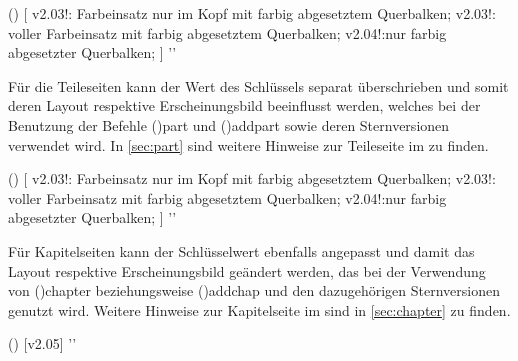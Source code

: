 \begin{DeclareEntity*}{}
\begin{DeclareEntity*}{}
\begin{DeclareEntity*}{}
\begin{Declaration}
  {}
  ()
[%
  v2.03!:%
    Farbeinsatz nur im Kopf mit farbig abgesetztem Querbalken;
  v2.03!:%
    voller Farbeinsatz mit farbig abgesetztem Querbalken;
  v2.04!:nur farbig abgesetzter Querbalken;%
]
  '\cdalias'
\printdeclarationlist[Teil|?]

Für die Teileseiten kann der Wert des Schlüssels  separat 
überschrieben und somit deren Layout respektive Erscheinungsbild beeinflusst 
werden, welches bei der Benutzung der Befehle 
\Macro(){part} und 
\Macro(){addpart} sowie deren Sternversionen 
verwendet wird. In \autoref{sec:part} sind weitere Hinweise zur Teileseite im 
\CD zu finden.
\end{Declaration}

\begin{Declaration}
  {}
  ()
[%
  v2.03!:%
    Farbeinsatz nur im Kopf mit farbig abgesetztem Querbalken;
  v2.03!:%
    voller Farbeinsatz mit farbig abgesetztem Querbalken;
  v2.04!:nur farbig abgesetzter Querbalken;%
]
  '\cdalias'
\printdeclarationlist[Kapitel|?]

Für Kapitelseiten kann der Schlüsselwert  ebenfalls angepasst 
und damit das Layout respektive Erscheinungsbild geändert werden, das bei der 
Verwendung von \Macro(){chapter} beziehungsweise 
\Macro(){addchap} und den dazugehörigen 
Sternversionen genutzt wird. Weitere Hinweise zur Kapitelseite im \CD sind in 
\autoref{sec:chapter} zu finden.
\end{Declaration}

\begin{Declaration}
  {}
  ()
  [v2.05]
  '\cdalias'
\printdeclarationlist


\end{Declaration}
\end{DeclareEntity*}
\end{DeclareEntity*}
\end{DeclareEntity*}

